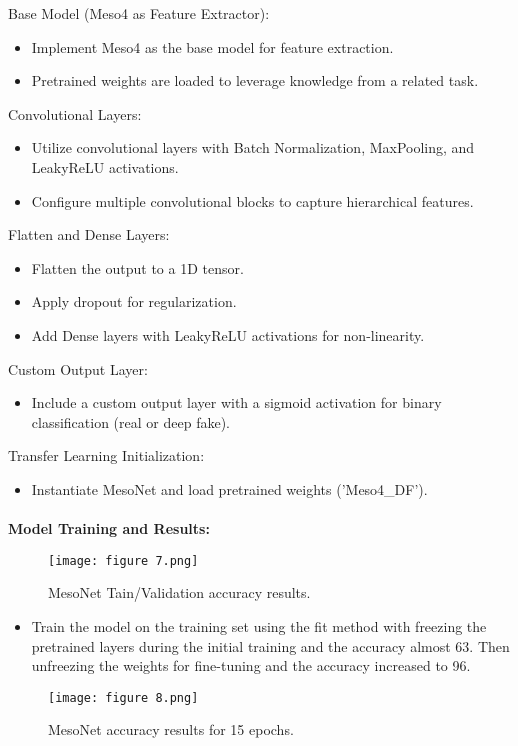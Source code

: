 \documentclass{article}
\begin{document}
Base Model (Meso4 as Feature Extractor):
\begin{itemize}
    \item Implement Meso4 as the base model for feature extraction.
    \item Pretrained weights are loaded to leverage knowledge from a related task.
\end{itemize}
Convolutional Layers:
\begin{itemize}
    \item Utilize convolutional layers with Batch Normalization, MaxPooling, and LeakyReLU activations.
    \item Configure multiple convolutional blocks to capture hierarchical features.
\end{itemize}
Flatten and Dense Layers:
\begin{itemize}
    \item Flatten the output to a 1D tensor.
    \item Apply dropout for regularization.
    \item Add Dense layers with LeakyReLU activations for non-linearity.
\end{itemize}
Custom Output Layer:
\begin{itemize}
    \item Include a custom output layer with a sigmoid activation for binary classification (real or deep fake).
\end{itemize}
Transfer Learning Initialization:
\begin{itemize}
    \item Instantiate MesoNet and load pretrained weights ('Meso4\_DF').
\end{itemize}

\paragraph{}
\textbf{Model Training and Results:}
\begin{figure}[h]
    \centering
    \texttt{[image: figure 7.png]}
    \caption{MesoNet Tain/Validation accuracy results.}
    \label{fig:enter-label}
\end{figure}
\begin{itemize}
    \item Train the model on the training set using the fit method with freezing the pretrained layers during the initial training and the accuracy almost 63. Then unfreezing the weights for fine-tuning and the accuracy increased to 96.
\end{itemize}
\begin{figure}[h]
    \centering
    \texttt{[image: figure 8.png]}
    \caption{MesoNet accuracy results for 15 epochs.}
    \label{fig:enter-label}
\end{figure}
\end{document}
